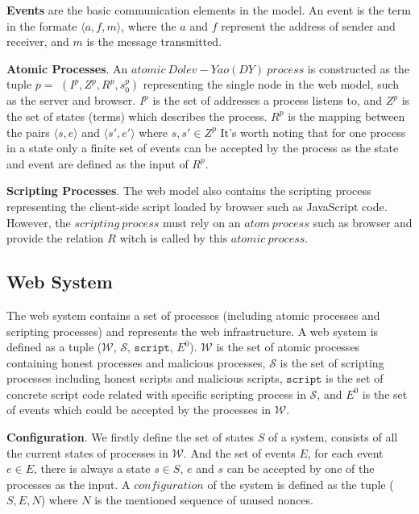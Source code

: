 \vspace{1mm}\noindent\textbf{Events } are the basic communication elements in the model.  An event is the term in the formate $\langle a, f, m \rangle$, where the $a$ and $f$ represent the address of sender and receiver, and $m$ is the message transmitted. 

\vspace{1mm}\noindent\textbf{Atomic Processes}.  An $atomic\ Dolev-Yao (DY)\ process$ is constructed as the tuple $p=$ $(I^p, Z^p, R^p,s_0^p )$ representing the single  node in the web model, such as the server and browser. $I^p$ is the set of addresses a process listens to, and $Z^p$ is the set of states (terms) which describes the process. $R^p$ is the mapping between the pairs $\langle s, e \rangle$ and $\langle s', e' \rangle$ where $s, s' \in Z^p$
It's worth noting that for one process in a state only a finite set of events can be accepted by the process as the state and event are defined as the input of $R^p$.

\vspace{1mm}\noindent\textbf{Scripting Processes}. The web model also contains the scripting process representing the client-side script loaded by browser such as JavaScript code. However, the $scripting\ process$ must rely on an $atom\ process$ such as browser and provide the relation $R$ witch is called by this $atomic\ process$. 



\subsection{Web System}
The web system contains a set of processes (including atomic processes and scripting processes) and represents the web infrastructure. A web system is defined as a tuple ($\mathcal{W}$, $\mathcal{S}$, $\mathtt{script}$, $E^0$). $\mathcal{W}$ is the set of atomic processes containing honest processes and malicious processes, $\mathcal{S}$ is the set of scripting processes including honest scripts and malicious scripts, $\mathtt{script}$ is the set of concrete script code related with specific scripting process in $\mathcal{S}$, and $E^0$ is the set of events which could be accepted by the processes in $\mathcal{W}$. 

\vspace{1mm}\noindent\textbf{Configuration}. 
We firstly define the set of states $S$ of a system, consists of all  the current states of  processes in $\mathcal{W}$. And the set of events $E$, for each event $e \in E$, there is always a state $s \in S$, $e$ and $s$ can be accepted by one of the processes as the input. A $configuration$ of the system is defined as the tuple ($S, E, N$) where $N$ is the mentioned sequence of unused nonces. 

